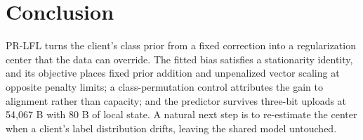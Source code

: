 \section{Conclusion}
PR-LFL turns the client's class prior from a fixed correction into a regularization center that the data can override. The fitted bias satisfies a stationarity identity, and its objective places fixed prior addition and unpenalized vector scaling at opposite penalty limits; a class-permutation control attributes the gain to alignment rather than capacity; and the predictor survives three-bit uploads at 54,067 B with 80 B of local state. A natural next step is to re-estimate the center when a client's label distribution drifts, leaving the shared model untouched.
